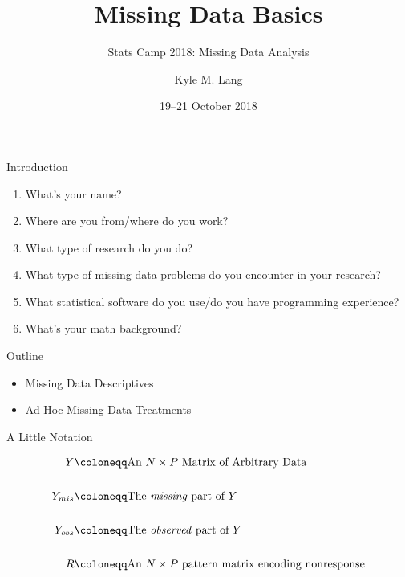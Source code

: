\documentclass{beamer}\usepackage[]{graphicx}\usepackage[]{color}
\title{Missing Data Basics}
\subtitle{Stats Camp 2018: Missing Data Analysis}
\author{Kyle M. Lang}
\institute{Department of Methodology \& Statistics\\Tilburg University}
\date{19--21 October 2018}
\begin{document}

\begin{frame}[t,plain]
  
  \titlepage
  
\end{frame}


\begin{frame}{Introduction}

  \begin{enumerate}
  \item What's your name?
    \vc
  \item Where are you from/where do you work?
    \vc
  \item What type of research do you do?
    \vc
  \item What type of missing data problems do you encounter in your research?
    \vc
  \item What statistical software do you use/do you have programming experience?
    \vc
  \item What's your math background?
  \end{enumerate}
  
\end{frame}


\begin{frame}{Outline}
  
  \begin{itemize}
  \item Missing Data Descriptives
    \vb
  \item Ad Hoc Missing Data Treatments
  \end{itemize}
  
\end{frame}


\begin{frame}{A Little Notation}
  
  \begin{align*}
    Y &\coloneqq \text{An $N \times P$ Matrix of Arbitrary Data}\\
    \\
    Y_{mis} &\coloneqq \text{The \emph{missing} part of $Y$}\\
    \\
    Y_{obs} &\coloneqq \text{The \emph{observed} part of $Y$}\\
    \\
    R &\coloneqq \text{An $N \times P$ pattern matrix encoding nonresponse}
  \end{align*}
  
\end{frame}
\end{document}
